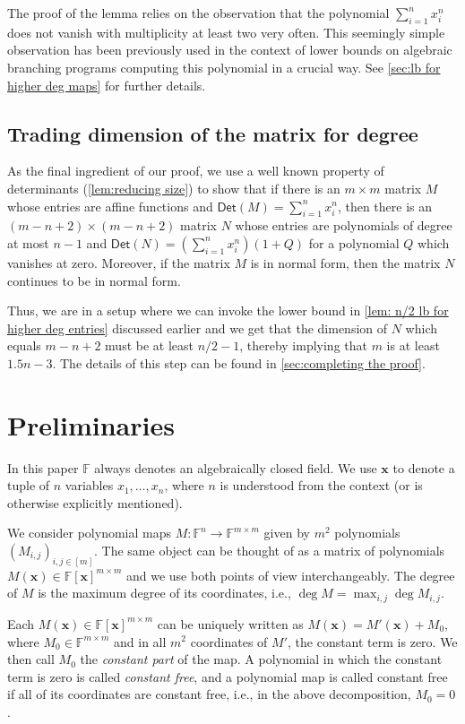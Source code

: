 \documentclass[10pt,a4paper]{article}
\newcommand{\F}{\mathbb{F}}
\newcommand{\vx}{\mathbf{x}}
\newcommand{\Det}{\mathsf{Det}}
\begin{document}
The proof of the lemma relies on the observation that the polynomial $\sum_{i = 1}^n x_i^n$ does not vanish with multiplicity at least two very often. This seemingly simple observation has been previously used in the context of lower bounds on algebraic branching programs computing this polynomial \cite{K19, CKSV19} in a crucial way. See \autoref{sec:lb for higher deg maps} for further details. 


\subsection*{Trading dimension of the matrix for degree}
As the  final ingredient of our proof, we use  a well known property of determinants (\autoref{lem:reducing size}) to show that if there is an $m \times m$ matrix $M$ whose entries are affine functions and $\Det(M) = \sum_{i = 1}^n x_i^n$, then there is an  $(m - n + 2)\times (m-n + 2)$ matrix $N$  whose entries are polynomials of degree at most $n-1$ and $\Det(N) = (\sum_{i = 1}^n x_i^n)(1 + Q)$ for a polynomial $Q$ which vanishes at zero. Moreover, if the matrix $M$ is in normal form, then the matrix $N$ continues to be in normal form. 

Thus, we are in a setup where we can invoke the lower bound in \autoref{lem: n/2 lb for higher deg entries} discussed earlier and we get that the dimension of $N$ which equals $m - n + 2$ must be at least $n/2-1$, thereby implying that $m$ is at least $1.5n - 3$. The details of this step can be found in \autoref{sec:completing the proof}. 

\section{Preliminaries}\label{sec:prelim}
In this paper $\F$ always denotes an algebraically closed field. We use $\vx$ to denote a tuple of $n$ variables $x_1, \ldots, x_n$, where $n$ is understood from the context (or is otherwise explicitly mentioned).

We consider polynomial maps $M : \F^n \to \F^{m \times m}$ given by $m^2$ polynomials $(M_{i,j})_{i,j\in [m]}$. The same object can be thought of as a matrix of polynomials $M(\vx) \in \F[\vx]^{m \times m}$ and we use both points of view interchangeably. The degree of $M$ is the maximum degree of its coordinates, i.e., $\deg M = \max_{i,j} \deg M_{i,j}$.

Each $M(\vx) \in \F[\vx]^{m \times m}$ can be uniquely written as $M(\vx) = M'(\vx) + M_0$, where $M_0 \in \F^{m \times m}$ and in all $m^2$ coordinates of $M'$, the constant term is zero. We then call $M_0$ the \emph{constant part} of the map. A polynomial in which the constant term is zero is called \emph{constant free}, and a polynomial map is called constant free if all of its coordinates are constant free, i.e., in the above decomposition, $M_0=0$.
\end{document}
